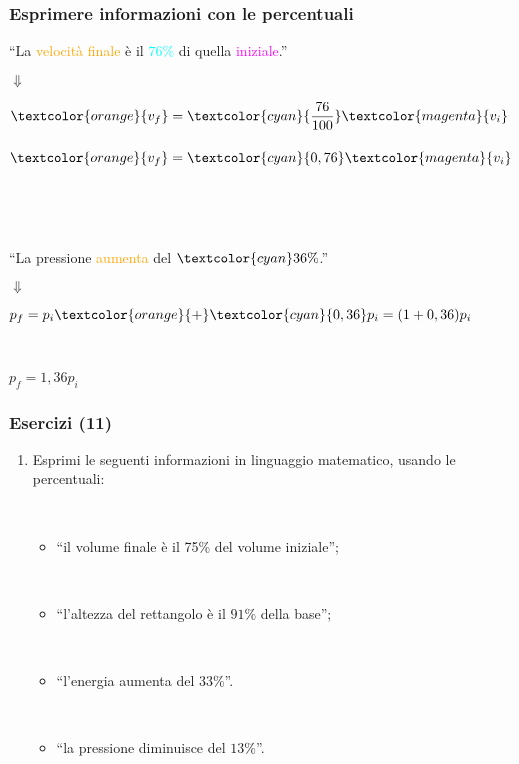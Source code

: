 \documentclass[]{beamer}
\begin{document}
\begin{frame}
\frametitle{Esprimere informazioni con le percentuali}
\begin{center}
``La \textcolor{orange}{velocità finale} è il \textcolor{cyan}{$ 76\% $} di quella \textcolor{magenta}{iniziale}.''

$ \Downarrow  $

$ \textcolor{orange}{v_f} = \textcolor{cyan}{\dfrac{76}{100}}\textcolor{magenta}{v_i} $~~~~~~~$ \textcolor{orange}{v_f} = \textcolor{cyan}{0,76} \textcolor{magenta}{v_i} $
\end{center}\pause

~

~

\begin{center}
``La pressione \textcolor{orange}{aumenta} del $ \textcolor{cyan}{36\%} $.''

$ \Downarrow  $

$ p_f = p_i \textcolor{orange}{+} \textcolor{cyan}{0,36}p_i = (1+0,36)p_i  $\pause

~

$ p_f = 1,36p_i $
\end{center}

\end{frame}


\begin{frame}
\frametitle{Esercizi (11)}
\begin{enumerate}
  \item Esprimi le seguenti informazioni in linguaggio matematico, usando le percentuali:
        
  ~
        
    \begin{itemize}
        \item ``il volume finale è il 75\% del volume iniziale'';

        ~
        
        \item ``l'altezza del rettangolo è il $ 91\% $ della base''; 
        
        ~
      
        \item ``l'energia aumenta del 33\%''.
        
        ~
        
        \item ``la pressione diminuisce del $ 13\% $''.
    \end{itemize}
\end{enumerate}
\end{frame}
\end{document}
